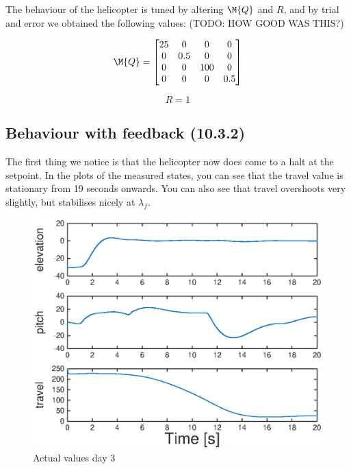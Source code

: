 The behaviour of the helicopter is tuned by altering $\M{Q}$ and $R$, and by trial and error we obtained the following values: (TODO: HOW GOOD WAS THIS?)

\begin{equation}
	\M{Q} = 
    \begin{bmatrix}
    	25 & 0 & 0 & 0 \\
        0 & 0.5 & 0 & 0 \\
        0 & 0 & 100 & 0 \\
        0 & 0 & 0 & 0.5
    \end{bmatrix}
\end{equation}

\begin{equation}
	R = 1
\end{equation}

\subsection{Behaviour with feedback (10.3.2)}

The first thing we notice is that the helicopter now does come to a halt at the setpoint. In the plots of the measured states, you can see that the travel value is stationary from 19 seconds onwards. You can also see that travel overshoots very slightly, but stabilises nicely at $\lambda_f$.

\begin{figure}[H]
	\centering
	\includegraphics[width=\textwidth]{day3}
	\caption{Actual values day 3}
	\label{fig:day3}
\end{figure}


